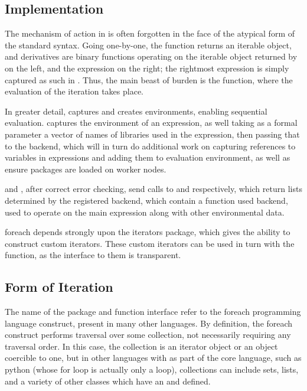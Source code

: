 \subsection{Implementation}\label{sec:implementation}

The mechanism of action in  is often forgotten in the face of the atypical form of the standard syntax.
Going one-by-one, the  function returns an iterable object,  and derivatives are binary functions operating on the iterable object returned by  on the left, and the expression on the right; the rightmost expression is simply captured as such in .
Thus, the main beast of burden is the  function, where the evaluation of the iteration takes place.

In greater detail,  captures and creates environments, enabling sequential evaluation.
 captures the
environment of an expression, as well taking as a formal parameter a
vector of names of libraries used in the expression, then passing that
to the backend, which will in turn do additional work on capturing
references to variables in expressions and adding them to evaluation
environment, as well as ensure packages are loaded on worker nodes.

 and , after correct error checking,
send calls to  and
 respectively, which return
lists determined by the registered backend, which contain a function
used backend, used to operate on the main expression along with other
environmental data.

foreach depends strongly upon the iterators package, which gives the
ability to construct custom iterators.
These custom iterators can be used in turn with the  function, as the interface to them is transparent.

\subsection{Form of Iteration}\label{sec:form-iter}

The name of the package and function interface refer to the foreach programming language construct, present in many other languages.
By definition, the foreach construct performs traversal over some collection, not necessarily requiring any traversal order.
In this case, the collection is an iterator object or an object coercible to one, but in other languages with  as part of the core language, such as python (whose for loop is actually only a  loop), collections can include sets, lists, and a variety of other classes which have an  and  defined\cite{python2020iter}.

